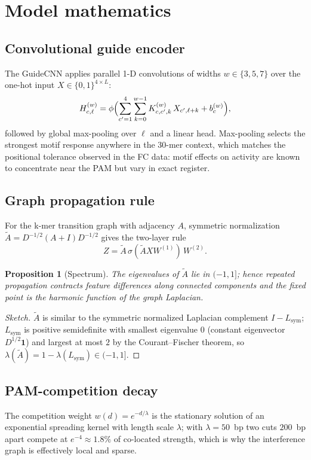 \documentclass[12pt]{article}
\newtheorem{proposition}{Proposition}
\begin{document}
\section{Model mathematics}
\subsection{Convolutional guide encoder}
The GuideCNN applies parallel 1-D convolutions of widths
$w \in \{3,5,7\}$ over the one-hot input $X \in \{0,1\}^{4 \times L}$:
\begin{equation}
H^{(w)}_{c,\ell} = \phi\Bigl(\sum_{c'=1}^{4}\sum_{k=0}^{w-1}
K^{(w)}_{c,c',k}\, X_{c',\ell+k} + b^{(w)}_c\Bigr),
\end{equation}
followed by global max-pooling over $\ell$ and a linear head. Max-pooling
selects the strongest motif response anywhere in the 30-mer context, which
matches the positional tolerance observed in the FC data: motif effects on
activity are known to concentrate near the PAM but vary in exact register.
\subsection{Graph propagation rule}
For the k-mer transition graph with adjacency $A$, symmetric normalization
$\tilde{A} = D^{-1/2}(A+I)D^{-1/2}$ gives the two-layer rule
\begin{equation}
Z = \tilde{A}\,\sigma(\tilde{A} X W^{(1)})\,W^{(2)} .
\end{equation}
\begin{proposition}[Spectrum]
The eigenvalues of $\tilde{A}$ lie in $(-1,1]$; hence repeated propagation
contracts feature differences along connected components and the fixed point
is the harmonic function of the graph Laplacian.
\end{proposition}
\begin{proof}[Sketch]
$\tilde{A}$ is similar to the symmetric normalized Laplacian complement
$I - L_{\text{sym}}$; $L_{\text{sym}}$ is positive semidefinite with smallest
eigenvalue $0$ (constant eigenvector $D^{1/2}\mathbf{1}$) and largest at most
$2$ by the Courant--Fischer theorem, so
$\lambda(\tilde{A}) = 1 - \lambda(L_{\text{sym}}) \in (-1,1]$.
\end{proof}
\subsection{PAM-competition decay}
The competition weight $w(d) = e^{-d/\lambda}$ is the stationary solution of
an exponential spreading kernel with length scale $\lambda$; with
$\lambda = 50$~bp two cuts $200$~bp apart compete at $e^{-4} \approx 1.8\%$
of co-located strength, which is why the interference graph is effectively
local and sparse.
\end{document}

